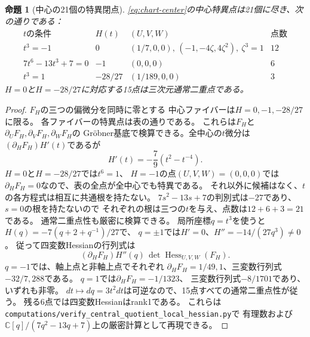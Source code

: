 \documentclass[11pt,a4paper]{ltjsarticle}
\newtheorem{proposition}[theorem]{命題}
\newcommand{\CC}{\mathbb C}
\begin{document}
\begin{proposition}[中心の21個の特異閉点]\label{prop:21}
\eqref{eq:chart-center}の中心特異点は21個に尽き、次の通りである：
\[
\begin{array}{c|c|c|c}
t\text{の条件}&H(t)&(U,V,W)&\text{点数}\\ \hline
t^3=-1&0&(1/7,0,0),\,(-1,-4\zeta,4\zeta^2),\ \zeta^3=1&12\\
7t^6-13t^3+7=0&-1&(0,0,0)&6\\
t^3=1&-28/27&(1/189,0,0)&3
\end{array}
\]
$H=0$と$H=-28/27$に対応する15点は三次元通常二重点である。
\end{proposition}
\begin{proof}
$F_H$の三つの偏微分を同時に零とする
中心ファイバーは$H=0,-1,-28/27$に限る。
各ファイバーの特異点は表の通りである。
これらは$F_H$と$\partial_UF_H,\partial_VF_H,\partial_WF_H$の
Gr\"obner基底で検算できる。全中心の$t$微分は
$(\partial_HF_H)H'(t)$であるが
\[
 H'(t)=-\frac79(t^2-t^{-4}).
\]
$H=0$と$H=-28/27$では$t^6=1$、
$H=-1$の点$(U,V,W)=(0,0,0)$では
$\partial_HF_H=0$なので、表の全点が全中心でも特異である。
それ以外に候補はなく、$t$の各方程式は相互に共通根を持たない。
$7s^2-13s+7$の判別式は$-27$であり、$s=0$の根を持たないので
それぞれの根は三つの$t$を与え、点数は$12+6+3=21$である。
通常二重点性も厳密に検算できる。
局所座標$q=t^3$を使うと$H(q)=-7(q+2+q^{-1})/27$で、
$q=\pm1$では$H'=0$、$H''=-14/(27q^3)\ne0$。
従って四変数Hessianの行列式は
\[
 (\partial_HF_H)H''(q)\,
 \det\operatorname{Hess}_{U,V,W}(F_H).
\]
$q=-1$では、軸上点と非軸上点でそれぞれ
$\partial_HF_H=1/49,1$、三変数行列式$-32/7,288$である。
$q=1$では$\partial_HF_H=-1/1323$、
三変数行列式$-8/1701$であり、いずれも非零。
$dt\mapsto dq=3t^2dt$は可逆なので、15点すべての通常二重点性が従う。
残る6点では四変数Hessianはrank1である。
これらは\texttt{computations/verify\_central\_quotient\_local\_hessian.py}で
有理数および$\CC[q]/(7q^2-13q+7)$上の厳密計算として再現できる。
\end{proof}
\end{document}

